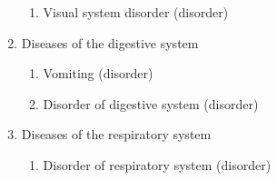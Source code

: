 \documentclass{article}[11pt,oneside]
\begin{document}
\begin{multicols}{2}
\begin{enumerate}
\begin{enumerate}
 \item Visual system disorder (disorder) %
 \end{enumerate} 
\item Diseases of the digestive system 
 \begin{enumerate} 
 \item Vomiting (disorder) %
 \item Disorder of digestive system (disorder)  %
 \end{enumerate} 
\item Diseases of the respiratory system 
 \begin{enumerate} 
 \item Disorder of respiratory system (disorder) %
 \end{enumerate} 
\end{enumerate}
\end{multicols}





\end{document}
